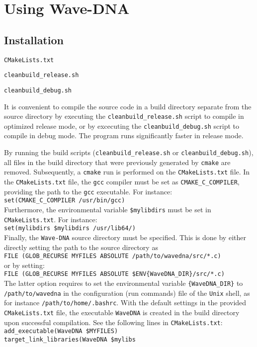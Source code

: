 \chapter{Using Wave-DNA}
\label{chap:Using Wave-DNA}



\section{Installation}
\label{sec:Installation}

\begin{compactitem}
\item {\tt CMakeLists.txt}
\item {\tt cleanbuild\_release.sh}
\item {\tt cleanbuild\_debug.sh}
\end{compactitem}
It is convenient to compile the source code in a build directory separate from the source directory by executing the {\tt cleanbuild\_release.sh} script to compile in optimized release mode, or by excecuting the {\tt cleanbuild\_debug.sh} script to compile in debug mode. The program runs significantly faster in release mode.

By running the build scripts ({\tt cleanbuild\_release.sh} or {\tt cleanbuild\_debug.sh}), all files in the build directory that were previously generated by {\tt cmake} are removed. Subsequently, a {\tt cmake} run is performed on the {\tt CMakeLists.txt} file. In the {\tt CMakeLists.txt} file, the {\tt gcc} compiler must be set as {\tt CMAKE\_C\_COMPILER}, providing the path to the {\tt gcc} executable. For instance:
\\[8pt]
{\tt set(CMAKE\_C\_COMPILER /usr/bin/gcc)}
\\[8pt]
Furthermore, the environmental variable  {\tt \${mylibdirs}} must be set in {\tt CMakeLists.txt}. For instance:
\\[8pt]
{\tt set(mylibdirs \${mylibdirs} /usr/lib64/)}
\\[8pt]
Finally, the {\tt Wave-DNA} source directory must be specified. This is done by either directly setting the path to the source directory as
\\[8pt]
{\tt FILE (GLOB\_RECURSE MYFILES ABSOLUTE  /path/to/wavedna/src/*.c)}
\\[8pt]
or by setting:
\\[8pt]
{\tt FILE (GLOB\_RECURSE MYFILES ABSOLUTE  \$ENV\{WaveDNA\_DIR\}/src/*.c)}
\\[8pt]
The latter option requires to set the environmental variable {\tt \{WaveDNA\_DIR\}} to {\tt /path/to/wavedna} in the configuration (run commands) file of the {\tt Unix} shell, as for instance {\tt /path/to/home/.bashrc}. With the default settings in the provided {\tt CMakeLists.txt} file, the executable {\tt WaveDNA} is created in the build directory upon successful compilation. See the following lines in {\tt CMakeLists.txt}:
\\[8pt]
{\tt add\_executable(WaveDNA \${MYFILES})} \\
{\tt target\_link\_libraries(WaveDNA \${mylibs}}
\\[8pt]


